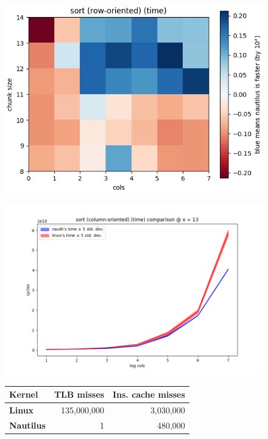 \documentclass[conference]{IEEEtran}
\begin{document}
\begin{figure}[t]
  \centering
  \begin{minipage}{0.31\linewidth}
    \centering
    \includegraphics[width=1\linewidth]{../plots/sort_2d.png}
    \label{fig:sort2d}
  \end{minipage}
  \hspace{0.01\linewidth}
  \begin{minipage}{0.31\linewidth}
    \centering
  \includegraphics[width=1\linewidth]{../plots/sort.png}
    \label{fig:colsort}
  \end{minipage}
  \begin{minipage}{0.31\linewidth}
    \centering
      \begin{tabular}{l || r | r }
        \textbf{Kernel}    & TLB misses  & Ins. cache misses \\
        \hline\hline
        \textbf{Linux}     & 135,000,000 & 3,030,000 \\
         \textbf{Nautilus} &           1 &   480,000 \\
      \end{tabular}


\end{minipage}
\end{figure}
\end{document}
